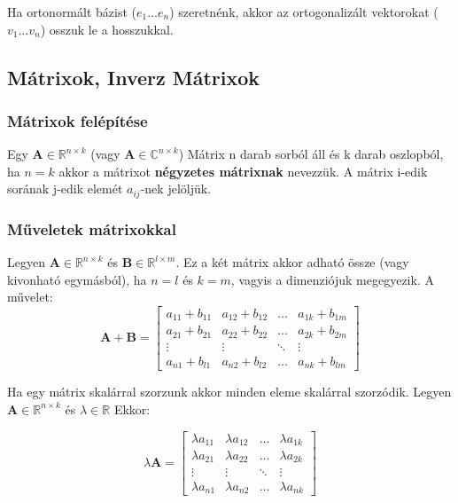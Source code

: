 \documentclass{article}
\begin{document}
Ha ortonormált bázist ($e_1 \dots e_n$) szeretnénk, akkor az ortogonalizált vektorokat ($v_1\dots v_n$) osszuk le a hosszukkal.

\subsection{Mátrixok, Inverz Mátrixok}

\subsubsection{Mátrixok felépítése}

Egy $\mathbf{A} \in \mathbb{R}^{n \times k}$ (vagy $\mathbf{A} \in \mathbb{C}^{n \times k}$) Mátrix n darab sorból áll és k darab oszlopból, ha $n = k$ akkor a mátrixot \textbf{négyzetes mátrixnak} nevezzük.
A mátrix i-edik sorának j-edik elemét $a_{ij}$-nek jelöljük.

\subsubsection{Műveletek mátrixokkal}

Legyen $\mathbf{A} \in \mathbb{R}^{n \times k}$ és $\mathbf{B} \in \mathbb{R}^{l \times m}$. Ez a két mátrix akkor adható össze (vagy kivonható egymásból), ha $n=l$ és $k = m$, vagyis a dimenziójuk megegyezik. A művelet:
\begin{equation*}
    \mathbf{A} + \mathbf{B} = \begin{bmatrix} a_{11}+b_{11} & a_{12}+b_{12} & \ldots & a_{1k}+b_{1m} \\ a_{21}+b_{21} & a_{22}+b_{22} & \ldots & a_{2k}+b_{2m} \\ \vdots & \vdots & \ddots & \vdots \\ a_{n1}+b_{l1} & a_{n2}+b_{l2} & \ldots & a_{nk}+b_{lm} \end{bmatrix}    
\end{equation*}

\newpage
Ha egy mátrix skalárral szorzunk akkor minden eleme skalárral szorzódik. Legyen $\mathbf{A} \in \mathbb{R}^{n \times k}$ és $\lambda \in \mathbb{R}$ Ekkor:

\begin{equation*}
     \lambda \mathbf{A} = \begin{bmatrix} \lambda a_{11} & \lambda a_{12} & \ldots &  \lambda a_{1k} \\ \lambda a_{21} & \lambda a_{22} & \ldots & \lambda a_{2k} \\ \vdots & \vdots & \ddots & \vdots \\ \lambda a_{n1} & \lambda a_{n2} & \ldots & \lambda a_{nk} \end{bmatrix}
\end{equation*}
\end{document}
